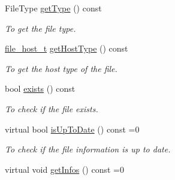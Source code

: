 \begin{DoxyCompactItemize}
FileType \hyperlink{classFile_ad83dca0e922f784eba36047e7f47fad7}{getType} () const 
\begin{DoxyCompactList}\small\item\em To get the file type. \item\end{DoxyCompactList}\item 
\hyperlink{File_8hpp_aaa08d9ac47a1aad716e3941312603212}{file\_\-host\_\-t} \hyperlink{classFile_a52ba4dce39f96117d09a5b52c97c57a5}{getHostType} () const 
\begin{DoxyCompactList}\small\item\em To get the host type of the file. \item\end{DoxyCompactList}\item 
bool \hyperlink{classFile_a44ecfb6abf4c56065e773785787f2fb0}{exists} () const 
\begin{DoxyCompactList}\small\item\em To check if the file exists. \item\end{DoxyCompactList}\item 
virtual bool \hyperlink{classFile_aac96e148c3f4e1271ed40fee9a88be77}{isUpToDate} () const =0
\begin{DoxyCompactList}\small\item\em To check if the file information is up to date. \item\end{DoxyCompactList}\item 
\hypertarget{classFile_a55331b760dc854b4a056c2d76dc03c9f}{
virtual void \hyperlink{classFile_a55331b760dc854b4a056c2d76dc03c9f}{getInfos} () const =0}
\label{classFile_a55331b760dc854b4a056c2d76dc03c9f}


\end{DoxyCompactItemize}
